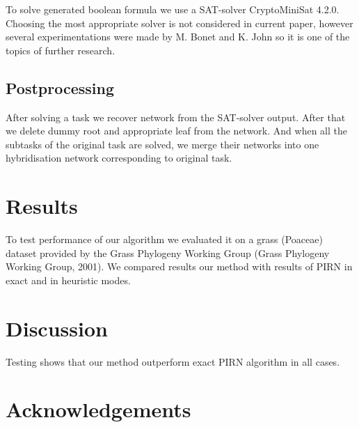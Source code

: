 \documentclass[runningheads, envcountsame, a4paper]{llncs}
\begin{document}
To solve generated boolean formula we use a SAT-solver CryptoMiniSat 4.2.0. Choosing the most appropriate solver 
is not considered in current paper, however several experimentations were made by M. Bonet and K. John \cite {bonet2009efficiently} 
so it is one of the topics of further research.

\subsection{Postprocessing}

After solving a task we recover network from the SAT-solver output. After that we delete dummy root and appropriate 
leaf from the network. And when all the subtasks of the original task are solved, we merge their networks into one 
hybridisation network corresponding to original task.

\section{Results}

To test performance of our algorithm we evaluated it on a grass (Poaceae) dataset provided by the Grass Phylogeny Working Group 
(Grass Phylogeny Working Group, 2001). We compared results our method with results of PIRN in exact and in heuristic modes. 

\section{Discussion}

Testing shows that our method outperform exact PIRN algorithm in all cases.

\section*{Acknowledgements}



\clearpage
\end{document}
